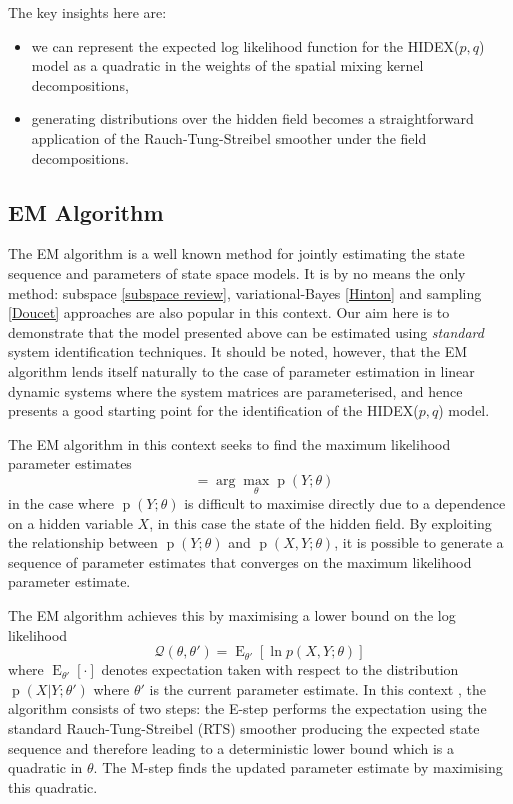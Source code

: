\documentclass{IEEEtran}
\DeclareMathOperator{\E}{E}
\DeclareMathOperator{\p}{p}
\DeclareMathOperator{\thetaML}{\theta_{\mathrm{ML}}}
\begin{document}
The key insights here are:
\begin{itemize}
	\item we can represent the expected log likelihood function for the HIDEX($p,q$) model as a quadratic in the weights of the spatial mixing kernel decompositions,
	\item generating distributions over the hidden field becomes a straightforward application of the Rauch-Tung-Streibel smoother \cite{Rauch} under the field decompositions.
\end{itemize} 

\subsection{EM Algorithm}

The EM algorithm is a well known method for jointly estimating the state sequence and parameters of state space models. It is by no means the only method: subspace \ref{subspace review}, variational-Bayes \ref{Hinton} and sampling \ref{Doucet} approaches are also popular in this context. Our aim here is to demonstrate that the model presented above can be estimated using \emph{standard} system identification techniques. It should be noted, however, that the EM algorithm lends itself naturally to the case of parameter estimation in linear dynamic systems where the system matrices are parameterised, and hence presents a good starting point for the identification of the HIDEX($p,q$) model.

The EM algorithm in this context seeks to find the maximum likelihood parameter estimates 
\begin{equation}
\thetaML=\arg\max_{\theta} \p (Y ; \theta)
\end{equation}
in the case where $\p(Y;\theta)$ is difficult to maximise directly due to a dependence on a hidden variable $X$, in this case the state of the hidden field. By exploiting the relationship between $\p(Y; \theta)$ and $\p(X,Y; \theta)$, it is possible to generate a sequence of parameter estimates that converges on the maximum likelihood parameter estimate.

The EM algorithm achieves this by maximising a lower bound on the log likelihood
\begin{equation}
	\mathcal{Q}(\theta,\theta')=\E_{\theta'}\left[\ln p(X,Y;\theta)\right]
\end{equation}
where $\E_{\theta'}[\cdot]$ denotes expectation taken with respect to the distribution $\p(X|Y ; \theta')$ where $\theta'$ is the current parameter estimate. In this context \cite{Gibson05}, the algorithm consists of two steps: the E-step performs the expectation using the standard Rauch-Tung-Streibel (RTS) smoother \cite{Rauch65} producing the expected state sequence and therefore leading to a deterministic lower bound which is a quadratic in $\theta$. The M-step finds the updated parameter estimate by maximising this quadratic.
\end{document}
